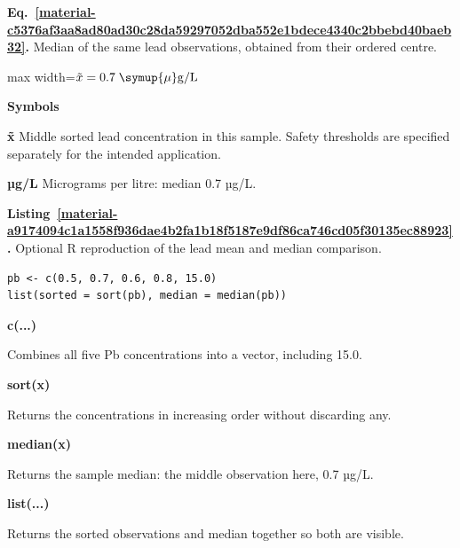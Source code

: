 \documentclass[11pt,a4paper]{article}
\newcounter{listing}
\begin{document}
\par\medskip
\begin{samepage}
\label{material-c5376af3aa8ad80ad30c28da59297052dba552e1bdece4340c2bbebd40baeb32}
\noindent\textbf{Eq.~\ref*{material-c5376af3aa8ad80ad30c28da59297052dba552e1bdece4340c2bbebd40baeb32}.} Median of the same lead observations, obtained from their ordered centre.\par\nopagebreak
\begin{center}\begin{adjustbox}{max width=\linewidth}$\displaystyle \tilde{x}=0.7\;\symup{\mu}\mathrm{g/L}$\end{adjustbox}\end{center}

\par\noindent\textbf{Symbols}

\par\noindent\textbf{x̃} Middle sorted lead concentration in this sample. Safety thresholds are specified separately for the intended application.

\par\noindent\textbf{µg/L} Micrograms per litre: median 0.7 µg/L.

\end{samepage}
\medskip

\par\medskip
{}
\label{material-a9174094c1a1558f936dae4b2fa1b18f5187e9df86ca746cd05f30135ec88923}
\noindent\textbf{Listing~\ref*{material-a9174094c1a1558f936dae4b2fa1b18f5187e9df86ca746cd05f30135ec88923}.} Optional R reproduction of the lead mean and median comparison.\par\nopagebreak
\begin{Verbatim}[fontsize=\footnotesize,breaklines=true,breakanywhere=true]
pb <- c(0.5, 0.7, 0.6, 0.8, 15.0)
list(sorted = sort(pb), median = median(pb))
\end{Verbatim}

\par\noindent\textbf{c(...)}

Combines all five Pb concentrations into a vector, including 15.0.

\par\noindent\textbf{sort(x)}

Returns the concentrations in increasing order without discarding any.

\par\noindent\textbf{median(x)}

Returns the sample median: the middle observation here, 0.7 µg/L.

\par\noindent\textbf{list(...)}

Returns the sorted observations and median together so both are visible.

\medskip
\end{document}

